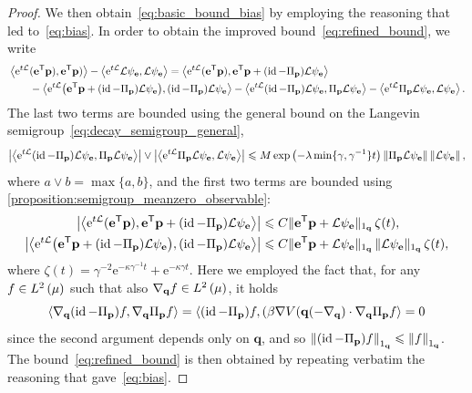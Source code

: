 \documentclass[11pt,a4paper]{article}
\DeclareMathOperator{\id}{id}
\newcommand{\e}{\mathrm{e}}
\newcommand{\grad}{\nabla}
\newcommand{\vect}[1]{\boldsymbol{\mathbf #1}}
\renewcommand{\t}{\mathsf T}
\theoremstyle{plain}
\numberwithin{equation}{section}
\renewcommand{\leq}{\leqslant}
\begin{document}
\begin{proof}
We then obtain~\eqref{eq:basic_bound_bias} by employing the reasoning that led to~\eqref{eq:bias}.
In order to obtain the improved bound~\eqref{eq:refined_bound},
we write
\begin{align*}
    &\ip{\e^{t \mathcal L}(\vect e^\t \vect p)}{\vect e^\t \vect p)} - \ip{\e^{t \mathcal L} \mathcal L \psi_{\vect e}}{\mathcal L \psi_{\vect e}}
    = \ip{\e^{t \mathcal L} (\vect e^\t \vect p)}{\vect e^\t \vect p + (\id - \Pi_{\vect p}) \mathcal L \psi_{\vect e}} \\
    &\qquad - \ip{\e^{t \mathcal L} \bigl(\vect e^\t \vect p + (\id - \Pi_{\vect p}) \mathcal L \psi_{\vect e}\bigr)}{(\id - \Pi_{\vect p}) \mathcal L \psi_{\vect e}}
    - \ip{\e^{t \mathcal L} (\id - \Pi_{\vect p}) \mathcal L \psi_{\vect e}}{\Pi_{\vect p} \mathcal L \psi_{\vect e}}
    - \ip{\e^{t \mathcal L} \Pi_{\vect p} \mathcal L \psi_{\vect e}}{\mathcal L \psi_{\vect e}}.
\end{align*}
The last two terms are bounded using the general bound on the Langevin semigroup~\eqref{eq:decay_semigroup_general},
\[
    \abs{\ip{\e^{t \mathcal L} (\id - \Pi_{\vect p}) \mathcal L \psi_{\vect e}}{\Pi_{\vect p} \mathcal L \psi_{\vect e}}}
    \vee \abs{\ip{\e^{t \mathcal L} \Pi_{\vect p} \mathcal L \psi_{\vect e}}{\mathcal L \psi_{\vect e}}}
    \leq M \exp \left( - \lambda \min\{\gamma, \gamma^{-1}\} t\right) \norm{\Pi_{\vect p} \mathcal L \psi_{\vect e}} \norm{\mathcal L \psi_{\vect e}},
\]
where $a \vee b = \max\{a, b\}$,
and the first two terms are bounded using \cref{proposition:semigroup_meanzero_observable}:
\begin{align*}
    \abs{\ip{\e^{t \mathcal L} (\vect e^\t \vect p)}{\vect e^\t \vect p + (\id - \Pi_{\vect p}) \mathcal L \psi_{\vect e}}}
    &\leq C \norm*{\vect e^\t \vect p + \mathcal L \psi_{\vect e}}[1_{\vect q}] \, \zeta(t), \\
    \abs{\ip{\e^{t \mathcal L} \bigl(\vect e^\t \vect p + (\id - \Pi_{\vect p}) \mathcal L \psi_{\vect e}\bigr)}{(\id - \Pi_{\vect p}) \mathcal L \psi_{\vect e}}}
    &\leq C \norm*{\vect e^\t \vect p + \mathcal L \psi_{\vect e}}[1_{\vect q}] \, \norm*{\mathcal L \psi_{\vect e}}[1_{\vect q}] \, \zeta(t),
\end{align*}
where $\zeta(t) = \gamma^{-2} \e^{- \kappa \gamma^{-1} t } + \e^{- \kappa \gamma t}$.
Here we employed the fact that, for any $f \in \lp{2}{\mu}$ such that also $\grad_{\vect q} f \in \lp{2}{\mu}$,
it holds
\[
    \ip{\grad_{\vect q} (\id - \Pi_{\vect p}) f}{\grad_{\vect q} \Pi_{\vect p} f}
    = \ip{(\id - \Pi_{\vect p}) f}{(\beta \grad V(\vect q( - \grad_{\vect q}) \cdot \grad_{\vect q} \Pi_{\vect p} f}
    = 0
\]
since the second argument depends only on $\vect q$,
and so $\norm{(\id - \Pi_{\vect p}) f}[1_{\vect q}] \leq \norm{f}[1_{\vect q}]$.
The bound~\eqref{eq:refined_bound} is then obtained by repeating verbatim the reasoning that gave~\eqref{eq:bias}.
\end{proof}
\end{document}
